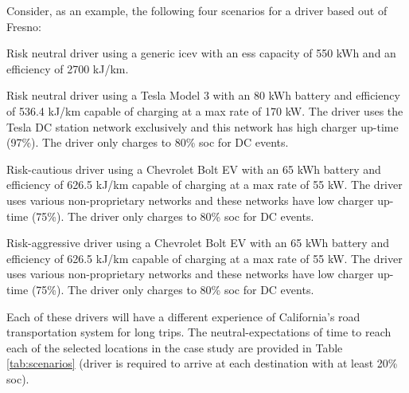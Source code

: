 \documentclass[11pt]{article}
\begin{document}
\begin{multicols}{2}
Consider, as an example, the following four scenarios for a driver based out of Fresno:


\begin{compactenum}
	\item Risk neutral driver using a generic \gls{icev} with an \gls{ess} capacity of 550 kWh and an efficiency of 2700 kJ/km.
	\item Risk neutral driver using a Tesla Model 3 with an 80 kWh battery and efficiency of 536.4 kJ/km capable of charging at a max rate of 170 kW. The driver uses the Tesla DC station network exclusively and this network has high charger up-time (97\%). The driver only charges to 80\% \gls{soc} for DC events.
	\item Risk-cautious driver using a Chevrolet Bolt EV with an 65 kWh battery and efficiency of 626.5 kJ/km capable of charging at a max rate of 55 kW. The driver uses various non-proprietary networks and these networks have low charger up-time (75\%). The driver only charges to 80\% \gls{soc} for DC events.
	\item Risk-aggressive driver using a Chevrolet Bolt EV with an 65 kWh battery and efficiency of 626.5 kJ/km capable of charging at a max rate of 55 kW. The driver uses various non-proprietary networks and these networks have low charger up-time (75\%). The driver only charges to 80\% \gls{soc} for DC events.
\end{compactenum}

Each of these drivers will have a different experience of California's road transportation system for long trips. The neutral-expectations of time to reach each of the selected locations in the case study are provided in Table \ref{tab:scenarios} (driver is required to arrive at each destination with  at least 20\% \gls{soc}).


\end{multicols}
\end{document}
